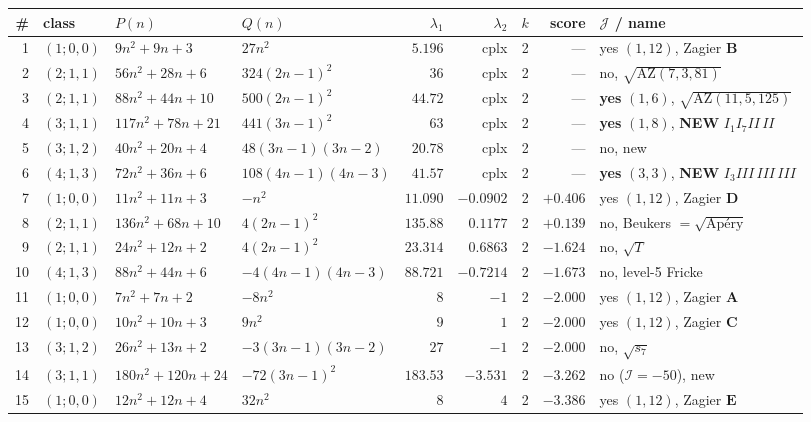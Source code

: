 \documentclass[11pt,reqno]{amsart}
\theoremstyle{plain}
\theoremstyle{definition}
\theoremstyle{remark}
\theoremstyle{plain}
\begin{document}
\begin{table}[t]
\scriptsize
\begin{tabular}{@{}rlllrrrrl@{}}
\hline
\# & class & $P(n)$ & $Q(n)$ & $\lambda_1$ & $\lambda_2$ & $k$ & score & $\mathcal J$ / name\\
\hline
1 & $(1;0,0)$ & $9n^2{+}9n{+}3$ & $27n^2$ & $5.196$ & cplx & 2 & --- & yes $(1,12)$, Zagier $\mathbf B$\\
2 & $(2;1,1)$ & $56n^2{+}28n{+}6$ & $324(2n{-}1)^2$ & $36$ & cplx & 2 & --- & no, $\sqrt{\mathrm{AZ}(7,3,81)}$\\
3 & $(2;1,1)$ & $88n^2{+}44n{+}10$ & $500(2n{-}1)^2$ & $44.72$ & cplx & 2 & --- & \textbf{yes} $(1,6)$, $\sqrt{\mathrm{AZ}(11,5,125)}$\\
4 & $(3;1,1)$ & $117n^2{+}78n{+}21$ & $441(3n{-}1)^2$ & $63$ & cplx & 2 & --- & \textbf{yes} $(1,8)$, \textbf{NEW} $I_1I_7II\,II$\\
5 & $(3;1,2)$ & $40n^2{+}20n{+}4$ & $48(3n{-}1)(3n{-}2)$ & $20.78$ & cplx & 2 & --- & no, new\\
6 & $(4;1,3)$ & $72n^2{+}36n{+}6$ & $108(4n{-}1)(4n{-}3)$ & $41.57$ & cplx & 2 & --- & \textbf{yes} $(3,3)$, \textbf{NEW} $I_3III\,III\,III$\\
7 & $(1;0,0)$ & $11n^2{+}11n{+}3$ & $-n^2$ & $11.090$ & $-0.0902$ & 2 & $\mathbf{+0.406}$ & yes $(1,12)$, Zagier $\mathbf D$\\
8 & $(2;1,1)$ & $136n^2{+}68n{+}10$ & $4(2n{-}1)^2$ & $135.88$ & $0.1177$ & 2 & $\mathbf{+0.139}$ & no, Beukers $=\sqrt{\text{Ap\'ery}}$\\
9 & $(2;1,1)$ & $24n^2{+}12n{+}2$ & $4(2n{-}1)^2$ & $23.314$ & $0.6863$ & 2 & $-1.624$ & no, $\sqrt T$\\
10 & $(4;1,3)$ & $88n^2{+}44n{+}6$ & $-4(4n{-}1)(4n{-}3)$ & $88.721$ & $-0.7214$ & 2 & $-1.673$ & no, level-5 Fricke\\
11 & $(1;0,0)$ & $7n^2{+}7n{+}2$ & $-8n^2$ & $8$ & $-1$ & 2 & $-2.000$ & yes $(1,12)$, Zagier $\mathbf A$\\
12 & $(1;0,0)$ & $10n^2{+}10n{+}3$ & $9n^2$ & $9$ & $1$ & 2 & $-2.000$ & yes $(1,12)$, Zagier $\mathbf C$\\
13 & $(3;1,2)$ & $26n^2{+}13n{+}2$ & $-3(3n{-}1)(3n{-}2)$ & $27$ & $-1$ & 2 & $-2.000$ & no, $\sqrt{s_7}$\\
14 & $(3;1,1)$ & $180n^2{+}120n{+}24$ & $-72(3n{-}1)^2$ & $183.53$ & $-3.531$ & 2 & $-3.262$ & no ($\mathcal I=-50$), new\\
15 & $(1;0,0)$ & $12n^2{+}12n{+}4$ & $32n^2$ & $8$ & $4$ & 2 & $-3.386$ & yes $(1,12)$, Zagier $\mathbf E$\\

\end{tabular}
\end{table}
\end{document}
